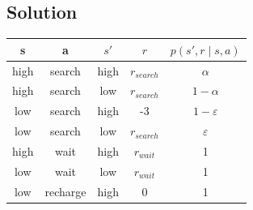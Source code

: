 \documentclass[11pt]{article}
\begin{document}
	\subsection*{Solution}
	\begin{tabular}{|c|c|c|c|c|}
		\hline
		s & a & $s'$  & $r$ & $p(s', r\mid s,a)$ \\
		\hline
		high & search & high & $r_{search}$ & $\alpha$  \\
		high & search & low & $r_{search}$ & $1-\alpha$ \\
		low & search & high  & -3& $1-\varepsilon$ \\
		low & search & low  & $r_{search}$& $\varepsilon$ \\
		high & wait & high & $r_{wait}$& 1  \\
	
	
		low & wait & low & $r_{wait}$ & 1  \\
		low & recharge & high & 0 & 1  \\
	
		\hline
	\end{tabular}
	
	
\end{document}
